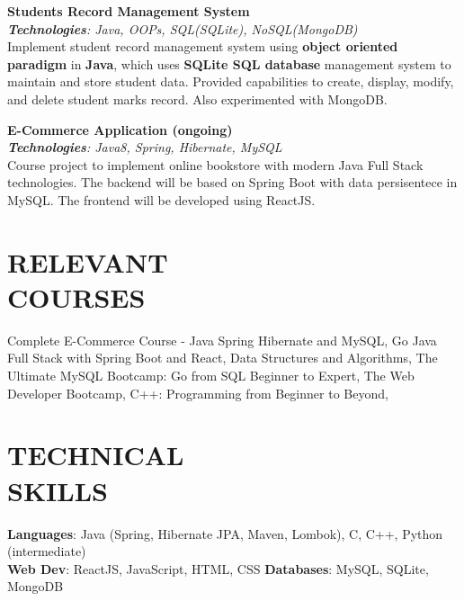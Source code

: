 \documentclass[resmargin]{res}
\begin{document}
\begin{resume}
\textbf{Students Record Management System \href{https://github.com/malavp1998/springboot-with-mongoDB}{\faGitSquare} \href{https://github.com/malavp1998/spring-boot-SqliteDB}{\faGitSquare}} {\sl  \hfill}
\\{\sl \textbf{Technologies}: Java, OOPs, SQL(SQLite), NoSQL(MongoDB)}
\\ Implement student record management system using \textbf{object oriented paradigm} in \textbf{Java}, which uses \textbf{SQLite SQL database} management system to maintain and store student data. Provided capabilities to create, display, modify, and delete student marks record. Also experimented with MongoDB.

\textbf{E-Commerce Application (ongoing)} {\sl  \hfill}
\\{\sl \textbf{Technologies}: Java8, Spring, Hibernate, MySQL }
\\ Course project to implement online bookstore with modern Java Full Stack technologies. The backend will be based on Spring Boot with data persisentece in MySQL. The frontend will be developed  using ReactJS.


\section{RELEVANT\\ COURSES}
Complete E-Commerce Course - Java Spring Hibernate and MySQL, Go Java Full Stack with Spring Boot and React, Data Structures and Algorithms, The Ultimate MySQL Bootcamp: Go from SQL Beginner to Expert, The Web Developer Bootcamp, C++: Programming from Beginner to Beyond,

\section{TECHNICAL\\SKILLS}

\textbf{Languages}: Java (Spring, Hibernate JPA, Maven, Lombok), C, C++, Python (intermediate) \\
\textbf{Web Dev}: ReactJS, JavaScript, HTML, CSS            \qquad \textbf{Databases}: MySQL, SQLite, MongoDB





\end{resume}
\end{document}
